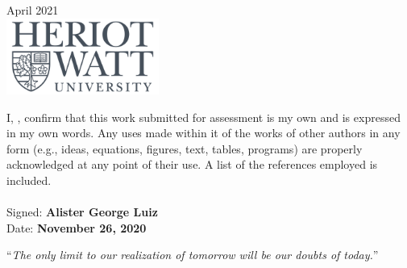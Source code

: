 \documentclass[
11pt, %
oneside,
english,
doublespacing, 
nolistspacing,
liststotoc, %
toctotoc, %
parskip, %
headsepline, %
consistentlayout, %
]{COVID-19 Detection - agl2} %
\begin{document}
\begin{titlepage}
\begin{center}
{\large April 2021}\\[0.4cm] %
\includegraphics[width=50mm,scale=0.4]{Images/logo.png} %
 

\end{center}
\end{titlepage}


\begin{declaration}
\addchaptertocentry{\authorshipname} %

\noindent I, \textbf{\authorname}, confirm that this work submitted for assessment is my own and is expressed in
my own words. Any uses made within it of the works of other authors in any form (e.g., ideas,
equations, figures, text, tables, programs) are properly acknowledged at any point of their
use. A list of the references employed is included.
\noindent \\\\Signed: \textbf{Alister George Luiz}\\
\noindent Date: \textbf{November 26, 2020}
\end{declaration}

\cleardoublepage


\vspace*{0.2\textheight}

\noindent\enquote{\itshape The only limit to our realization of tomorrow will be our doubts of today.}\bigbreak
\end{document}
